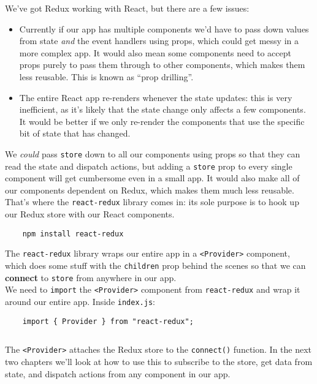We've got Redux working with React, but there are a few issues:

\begin{itemize}
    \item Currently if our app has multiple components we'd have to pass down values from state \textit{and} the event handlers using props, which could get messy in a more complex app. It would also mean some components need to accept props purely to pass them through to other components, which makes them less reusable. This is known as ``prop drilling''.
    \item The entire React app re-renders whenever the state updates: this is very inefficient, as it's likely that the state change only affects a few components. It would be better if we only re-render the components that use the specific bit of state that has changed.
\end{itemize}

We \textit{could} pass \texttt{store} down to all our components using props so that they can read the state and dispatch actions, but adding a \texttt{store} prop to every single component will get cumbersome even in a small app. It would also make all of our components dependent on Redux, which makes them much less reusable.
\\

That's where the \texttt{react-redux} library comes in: its sole purpose is to hook up our Redux store with our React components.

\begin{verbatim}
    npm install react-redux
\end{verbatim}

The \texttt{react-redux} library wraps our entire app in a \texttt{<Provider>} component, which does some stuff with the \texttt{children} prop behind the scenes so that we can \textbf{connect} to \texttt{store} from anywhere in our app.
\\

We need to \texttt{import} the \texttt{<Provider>} component from \texttt{react-redux} and wrap it around our entire app. Inside \texttt{index.js}:

\begin{verbatim}
    import { Provider } from "react-redux";
\end{verbatim}

\inputminted{jsx}{02/figures/01/01-index.js}

The \texttt{<Provider>} attaches the Redux store to the \texttt{connect()} function. In the next two chapters we'll look at how to use this to subscribe to the store, get data from state, and dispatch actions from any component in our app.
\\


